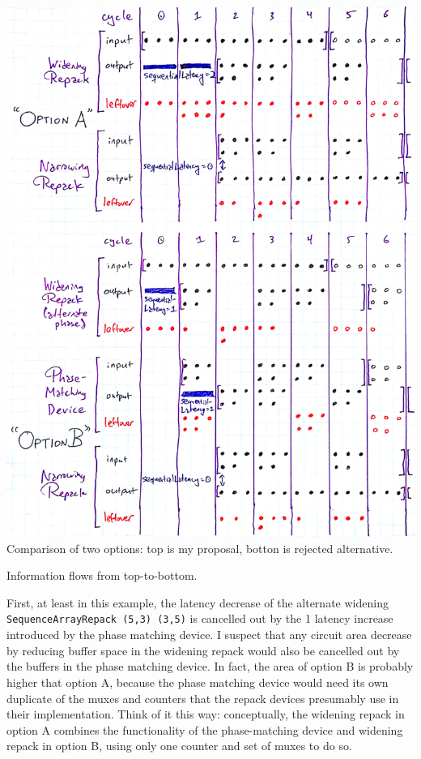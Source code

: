 \documentclass[12pt]{article}
\begin{document}
\begin{center}
\includegraphics[width=1.0\linewidth]{Figures/phase-comparison.jpg}
Comparison of two options: top is my proposal, botton is rejected alternative.

Information flows from top-to-bottom.
\end{center}

First, at least in this example, the latency decrease of the alternate
widening \texttt{SequenceArrayRepack (5,3) (3,5)} is cancelled out by
the 1 latency increase introduced by the phase matching device.  I
suspect that any circuit area decrease by reducing buffer space in the
widening repack would also be cancelled out by the buffers in the
phase matching device. In fact, the area of option B is probably
higher that option A, because the phase matching device would need its
own duplicate of the muxes and counters that the repack devices
presumably use in their implementation. Think of it this way:
conceptually, the widening repack in option A combines the
functionality of the phase-matching device and widening repack in
option B, using only one counter and set of muxes to do so.
\end{document}
